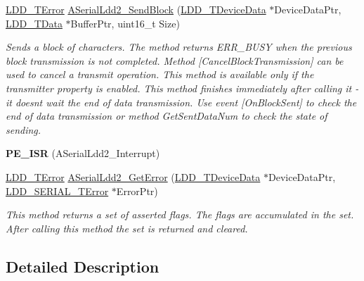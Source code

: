 \begin{DoxyCompactItemize}
\hyperlink{group___p_e___types__module_ga24c2b045fd04e79e85f261ce4df35588}{L\+D\+D\+\_\+\+T\+Error} \hyperlink{group___a_serial_ldd2__module_gabd167598efd957d04eb9bdd2e51ae673}{A\+Serial\+Ldd2\+\_\+\+Send\+Block} (\hyperlink{group___p_e___types__module_gac5cf1362f1f0e3a2ce71b1bf2276d091}{L\+D\+D\+\_\+\+T\+Device\+Data} $\ast$Device\+Data\+Ptr, \hyperlink{group___p_e___types__module_gade8ef9401405bd941b6da738b807f980}{L\+D\+D\+\_\+\+T\+Data} $\ast$Buffer\+Ptr, uint16\+\_\+t Size)
\begin{DoxyCompactList}\small\item\em Sends a block of characters. The method returns E\+R\+R\+\_\+\+B\+U\+SY when the previous block transmission is not completed. Method \mbox{[}Cancel\+Block\+Transmission\mbox{]} can be used to cancel a transmit operation. This method is available only if the transmitter property is enabled. This method finishes immediately after calling it -\/ it doesn\textquotesingle{}t wait the end of data transmission. Use event \mbox{[}On\+Block\+Sent\mbox{]} to check the end of data transmission or method Get\+Sent\+Data\+Num to check the state of sending. \end{DoxyCompactList}\item 
\mbox{\label{group___a_serial_ldd2__module_ga8de88a30826abcdb10eeab68cc30bb09}} 
{\bfseries P\+E\+\_\+\+I\+SR} (A\+Serial\+Ldd2\+\_\+\+Interrupt)
\item 
\hyperlink{group___p_e___types__module_ga24c2b045fd04e79e85f261ce4df35588}{L\+D\+D\+\_\+\+T\+Error} \hyperlink{group___a_serial_ldd2__module_gafab1fb38c1ca4d64933a973a271ad7b0}{A\+Serial\+Ldd2\+\_\+\+Get\+Error} (\hyperlink{group___p_e___types__module_gac5cf1362f1f0e3a2ce71b1bf2276d091}{L\+D\+D\+\_\+\+T\+Device\+Data} $\ast$Device\+Data\+Ptr, \hyperlink{group___p_e___types__module_ga3bd5d57e02458ce220540d0ad0462e06}{L\+D\+D\+\_\+\+S\+E\+R\+I\+A\+L\+\_\+\+T\+Error} $\ast$Error\+Ptr)
\begin{DoxyCompactList}\small\item\em This method returns a set of asserted flags. The flags are accumulated in the set. After calling this method the set is returned and cleared. \end{DoxyCompactList}\end{DoxyCompactItemize}


\subsection{Detailed Description}


